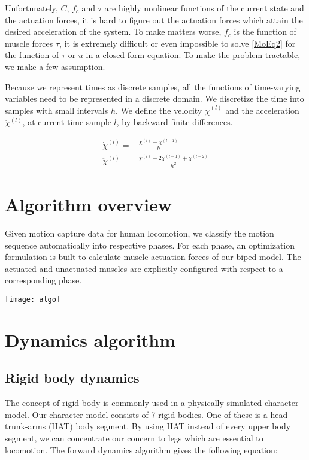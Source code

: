 \documentclass[a4paper,10pt]{article}
\begin{document}
Unfortunately, $C$, $f_c$ and $\tau$ are highly nonlinear functions of the current state and the
actuation forces, it is hard to figure out the actuation forces which attain
the desired acceleration of the system. To make matters worse, $f_c$ is the function
of muscle forces $\tau$, it is extremely difficult or even impossible
to solve \eqref{MoEq2} for the function of $\tau$ or $u$ in a closed-form
equation.
To make the problem tractable, we make a few assumption. 

Because we represent times as discrete samples, all the functions of
time-varying variables need to be represented in a discrete domain.
We discretize the time into samples with small intervals $h$. We define
the velocity $\dot\chi^{(l)}$ and the acceleration $\ddot\chi^{(l)}$, at current
time sample $l$, by backward finite differences.

\begin{align}
\dot\chi^{(l)}  = {} & \frac{\chi^{(l)}-\chi^{(l-1)}}{h}\label{vel-dis}\\
\ddot\chi^{(l)} = {} & \frac{\chi^{(l)}-2\chi^{(l-1)}+\chi^{(l-2)}}{h^2}\label{acc-dis}
\end{align}


\pagebreak

\section{Algorithm overview}

Given motion capture data for human locomotion, we classify the motion
sequence automatically into respective phases. For each phase,
an optimization formulation is built to calculate muscle actuation forces
of our biped model. The actuated and unactuated muscles are explicitly configured
with respect to a corresponding phase.


\texttt{[image: algo]}

\pagebreak

\section{Dynamics algorithm}

\subsection{Rigid body dynamics}

The concept of rigid body is commonly used in a physically-simulated
character model.
Our character model consists of 7 rigid bodies. One of these is
a head-trunk-arms (HAT) body segment. By using HAT instead of every upper body
segment, we can concentrate our concern to legs which are essential to
locomotion. The forward dynamics algorithm gives the following equation:
\end{document}

